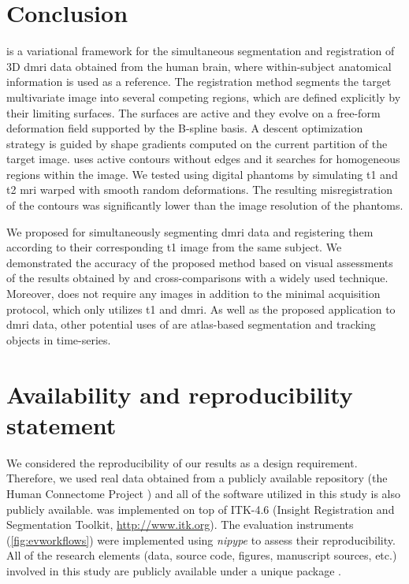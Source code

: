 \section*{Conclusion}
\label{sec:conclusion}

\Regseg{} is a variational framework for the simultaneous segmentation and
  registration of 3D \gls*{dmri} data obtained from the human brain, where within-subject
  anatomical information is used as a reference.
The registration method segments the target multivariate image into several competing regions, which are
  defined explicitly by their limiting surfaces.
The surfaces are active and they evolve on a free-form deformation field supported by the B-spline basis.
A descent optimization strategy is guided by shape gradients computed on the current partition
  of the target image.
\Regseg{} uses active contours without edges and it searches for
  homogeneous regions within the image.
We tested \regseg{} using digital phantoms by simulating \gls*{t1} and \gls*{t2} \gls*{mri}
  warped with smooth random deformations.
The resulting misregistration of the contours was significantly lower than the image resolution
  of the phantoms.

We proposed \regseg{} for simultaneously segmenting \gls*{dmri} data and registering them according to
  their corresponding \gls*{t1} image from the same subject.
We demonstrated 
  the accuracy of the proposed method based on visual assessments of the results obtained by \regseg{} and cross-comparisons with a widely used technique.
Moreover, \regseg{} does not require any images in addition to the minimal acquisition protocol,
  which only utilizes \gls*{t1} and \gls*{dmri}.
As well as the proposed application to \gls*{dmri} data, other potential uses of \regseg{} are
  atlas-based segmentation and tracking objects in time-series.


\section*{Availability and reproducibility statement}
\label{sec:availability}
We considered the reproducibility of our results as a design requirement.
Therefore, we used real data obtained from a publicly available repository
  (the Human Connectome Project \citep{essen_human_2012}) and all of the software
  utilized in this study is also publicly available.
\Regseg{} was implemented on top of ITK-4.6 (Insight Registration and 
  Segmentation Toolkit, \url{http://www.itk.org}).
The evaluation instruments (\autoref{fig:evworkflows}) were implemented using
  \emph{nipype} \citep{gorgolewski_nipype_2011} to assess their reproducibility.
All of the research elements (data, source code, figures, manuscript sources, etc.) involved in this study
  are publicly available under a unique package \citep{esteban_acweregistration_2015}. 